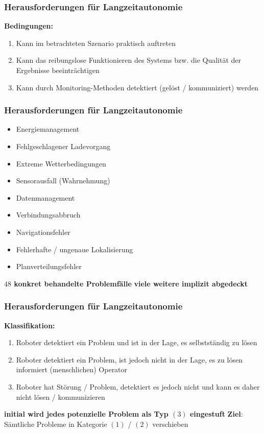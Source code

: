 \documentclass{beamer}
\begin{document}
\begin{frame}
  \frametitle{Herausforderungen für Langzeitautonomie}
  \textbf{Bedingungen:}
  \begin{enumerate}
    \item Kann im betrachteten Szenario praktisch auftreten
    \item Kann das reibungslose Funktionieren des Systems bzw. die Qualität der Ergebnisse beeinträchtigen
    \item Kann durch Monitoring-Methoden detektiert (gelöst / kommuniziert) werden
  \end{enumerate}
\end{frame}

\begin{frame}
  \frametitle{Herausforderungen für Langzeitautonomie}
  \begin{itemize}
    \item Energiemanagement
    \item Fehlgeschlagener Ladevorgang
    \item Extreme Wetterbedingungen
    \item Sensorausfall (Wahrnehmung)
    \item Datenmanagement
    \item Verbindungsabbruch
    \item Navigationsfehler
    \item Fehlerhafte / ungenaue Lokalisierung
    \item Planverteilungsfehler
  \end{itemize}
  \textrightarrow \thinspace \textbf{$48$ konkret behandelte Problemfälle}\newline
  \textrightarrow \thinspace \textbf{viele weitere implizit abgedeckt}
\end{frame}

\begin{frame}
  \frametitle{Herausforderungen für Langzeitautonomie}
  \textbf{Klassifikation:}
  \begin{enumerate}
    \item Roboter detektiert ein Problem und ist in der Lage, es selbstständig zu lösen
    \item Roboter detektiert ein Problem, ist jedoch nicht in der Lage, es zu lösen \textrightarrow \thinspace informiert (menschlichen) Operator
    \item Roboter hat Störung / Problem, detektiert es jedoch nicht und kann es daher nicht lösen / kommunizieren
  \end{enumerate}
  \textrightarrow \thinspace \textbf{initial wird jedes potenzielle Problem als Typ $(3)$ eingestuft}\newline
  \textbf{Ziel}: Sämtliche Probleme in Kategorie $(1)$ / $(2)$ verschieben
\end{frame}
\end{document}
